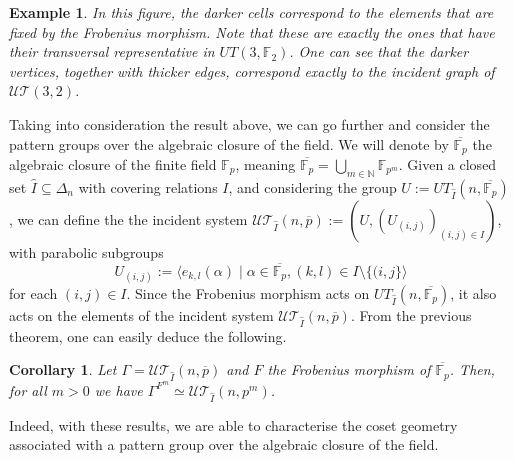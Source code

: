 \documentclass[11pt,letterpaper]{amsart}
\newtheorem{exmp}{Example}[section]
\newtheorem{coro}[theorem]{Corollary}
\newcommand{\TT}{\mathcal{T}}
\newcommand{\FF}{\mathbb{F}}
\newcommand{\UU}{\mathcal{U}}
\begin{document}
\begin{exmp}
In this figure, the darker cells correspond to the elements that are fixed by the Frobenius morphism. Note that these are exactly the ones that have their transversal representative in $UT(3,\FF_2)$. One can see that the darker vertices, together with thicker edges, correspond exactly to the incident graph of $\UU\TT(3,2)$.

\end{exmp}

Taking into consideration the result above, we can go further and consider the pattern groups over the algebraic closure of the field. 
We will denote by $\overline{\FF_p}$ the algebraic closure of the finite field $\FF_p$, meaning $\overline{\FF_p} = \bigcup_{m\in \mathbb{N}} \FF_{p^m}$. 
Given a closed set $\widehat{I}\subseteq \Delta_n$ with covering relations $I$, and considering the group $U:=UT_{\widehat{I}}(n,\overline{\FF_p})$, we can define the the incident system $\UU\TT_{\widehat{I}}(n,\overline{p}):=(U,(U_{(i,j)})_{(i,j)\in I})$, with parabolic subgroups
$$U_{(i,j)}:=\langle e_{k,l}(\alpha)\mid \alpha\in \overline{\FF_p},(k,l)\in I\setminus \{(i,j\}\rangle$$
for each $(i,j)\in I$. 
Since the Frobenius morphism acts on $UT_{\widehat{I}}(n,\overline{\FF_p})$, it also acts on the elements of the incident system $\UU\TT_{\widehat{I}}(n,\overline{p})$. From the previous theorem, one can easily deduce the following.

\begin{coro}
    Let $\Gamma=\UU\TT_{\widehat{I}} (n,\overline{p})$ and $F$ the Frobenius morphism of $\overline{\FF_p}$. Then, for all $m>0$ we have $\Gamma^{F^m}\simeq \UU\TT_{\widehat{I}} (n,p^m)$.
\end{coro}

Indeed, with these results, we are able to characterise the coset geometry associated with a pattern group over the algebraic closure of the field.
\end{document}

